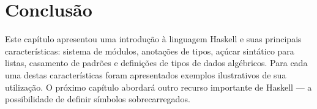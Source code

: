 \section{Conclus\~ao} 

Este cap\'itulo apresentou uma introdu\c{c}\~ao \`a linguagem Haskell e suas
principais caracter\'isticas: sistema de m\'odulos, anota\c{c}\~oes de tipos,
a\c{c}\'ucar sint\'atico para listas, casamento de padr\~oes e defini\c{c}\~oes
de tipos de dados alg\'ebricos. Para cada uma destas caracter\'isticas foram apresentados
exemplos ilustrativos de sua utiliza\c{c}\~ao. O pr\'oximo cap\'itulo abordar\'a
outro recurso importante de Haskell --- a possibilidade de definir s\'imbolos
sobrecarregados.
